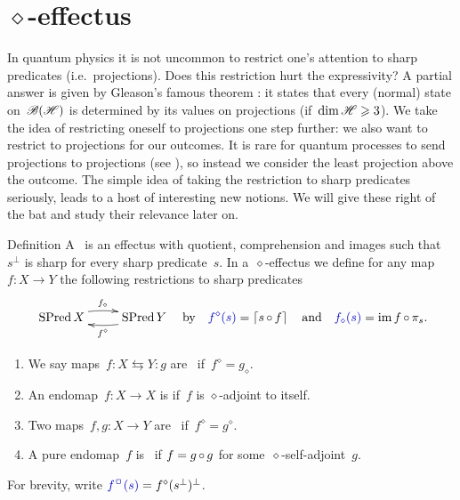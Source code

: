 \documentclass[b]{subfiles}
\begin{document}
\section{$\diamond$-effectus}
\begin{parsec}%
\begin{point}%
In quantum physics it is not uncommon to restrict one's attention
    to sharp predicates (i.e.~projections).
Does this restriction hurt the expressivity?
A partial answer is given by Gleason's famous theorem \cite{gleason1957measures}:
    it states that every (normal) state on~$\mathscr{B}(\mathscr{H})$
    is determined by its values on projections
    (if~$\dim \mathscr{H} \geqslant 3$).
We take the idea of restricting oneself to projections
    one step further: we also want to restrict to projections
    for our outcomes.
It is rare for quantum processes to send projections to projections
    (see ),
    so instead we consider the least projection above the outcome.
The simple idea of taking the restriction to sharp predicates
    seriously, leads to a host of interesting new notions.
We will give these right of the bat and study their relevance later on.
\end{point}
\begin{point}{Definition}%
A~
    is an effectus with quotient, comprehension and images
    such that~$s^\perp$ is sharp for every sharp predicate~$s$.
In a~$\diamond$-effectus
    we define for any map~$f\colon X \to Y$
    the following restrictions to sharp predicates
    \begin{equation*}
        \xymatrix{
            \SPred X  \ar@/^/[r]^{f_\diamond}
            & \SPred Y \ar@/^/[l]^{f^\diamond}}
            \quad \text{by} \quad
            \Define{f^\diamond(s)} = \ceil{s \after f}
            \quad
            \text{and}
            \quad
            \Define{f_\diamond(s)} = \IM f \after \pi_s.
    \end{equation*}
    \begin{enumerate}
        \item
    We say maps~$f \colon X \leftrightarrows Y\colon g$
        are~
        if~$f^\diamond = g_\diamond$.
    \item
    An endomap~$f\colon X \to X$ is 
        if~$f$ is $\diamond$-adjoint to itself.
    \item
    Two maps~$f,g\colon X \to Y$
        are~
        if~$f^\diamond = g^\diamond$.
    \item
        A pure endomap~$f$ is~
            if $f = g\mathop{\circ} g$ for some~$\diamond$-self-adjoint~$g$.
    \end{enumerate}
For brevity, write $\Define{f^\BOX(s)} = f^\diamond(s^\perp)^\perp$.
\end{point}
\end{parsec}
\end{document}
